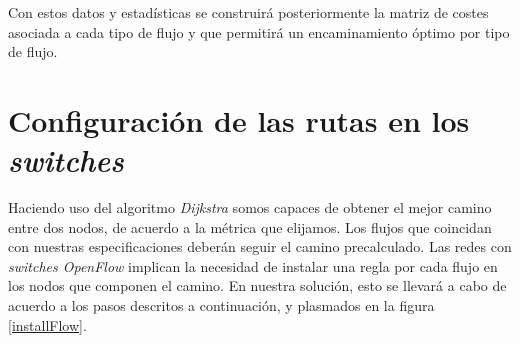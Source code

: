 \documentclass[a4paper,11pt]{book}
\begin{document}
Con estos datos y estadísticas se construirá posteriormente la matriz de costes asociada a cada tipo de flujo y que permitirá un encaminamiento óptimo por tipo de flujo.

%
%
\section{Configuración de las rutas en los \emph{switches}}

Haciendo uso del algoritmo \textit{Dijkstra} somos capaces de obtener el mejor camino entre dos nodos, de acuerdo a la métrica que elijamos. Los flujos que coincidan con nuestras especificaciones deberán seguir el camino precalculado. Las redes con \emph{switches OpenFlow} implican la necesidad de instalar una regla por cada flujo en los nodos que componen el camino. En nuestra solución, esto se llevará a cabo de acuerdo a los pasos descritos a continuación, y plasmados en la figura \ref{installFlow}.
\end{document}
